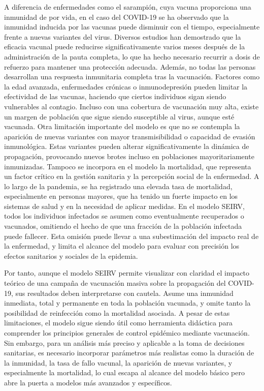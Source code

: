 A diferencia de enfermedades como el sarampión, cuya vacuna proporciona una inmunidad de por vida, en el caso del COVID-19 se ha observado que la inmunidad inducida por las vacunas puede disminuir con el tiempo, especialmente frente a nuevas variantes del virus. Diversos estudios han demostrado que la eficacia vacunal puede reducirse significativamente varios meses después de la administración de la pauta completa, lo que ha hecho necesario recurrir a dosis de refuerzo para mantener una protección adecuada.
Además, no todas las personas desarrollan una respuesta inmunitaria completa tras la vacunación. Factores como la edad avanzada, enfermedades crónicas o inmunodepresión pueden limitar la efectividad de las vacunas, haciendo que ciertos individuos sigan siendo vulnerables al contagio. Incluso con una cobertura de vacunación muy alta, existe un margen de población que sigue siendo susceptible al virus, aunque esté vacunada.
Otra limitación importante del modelo es que no se contempla la aparición de nuevas variantes con mayor transmisibilidad o capacidad de evasión inmunológica. Estas variantes pueden alterar significativamente la dinámica de propagación, provocando nuevos brotes incluso en poblaciones mayoritariamente inmunizadas.
Tampoco se incorpora en el modelo la mortalidad, que representa un factor crítico en la gestión sanitaria y la percepción social de la enfermedad. A lo largo de la pandemia, se ha registrado una elevada tasa de mortalidad, especialmente en personas mayores, que ha tenido un fuerte impacto en los sistemas de salud y en la necesidad de aplicar medidas. En el modelo SEIRV, todos los individuos infectados se asumen como eventualmente recuperados o vacunados, omitiendo el hecho de que una fracción de la población infectada puede fallecer. Esta omisión puede llevar a una subestimación del impacto real de la enfermedad, y limita el alcance del modelo para evaluar con precisión los efectos sanitarios y sociales de la epidemia.

Por tanto, aunque el modelo SEIRV permite visualizar con claridad el impacto teórico de una campaña de vacunación masiva sobre la propagación del COVID-19, sus resultados deben interpretarse con cautela. Asume una inmunidad inmediata, total y permanente en toda la población vacunada, y omite tanto la posibilidad de reinfección como la mortalidad asociada.
A pesar de estas limitaciones, el modelo sigue siendo útil como herramienta didáctica para comprender los principios generales de control epidémico mediante vacunación. Sin embargo, para un análisis más preciso y aplicable a la toma de decisiones sanitarias, es necesario incorporar parámetros más realistas como la duración de la inmunidad, la tasa de fallo vacunal, la aparición de nuevas variantes, y especialmente la mortalidad, lo cual escapa al alcance del modelo básico pero abre la puerta a modelos más avanzados y específicos.
